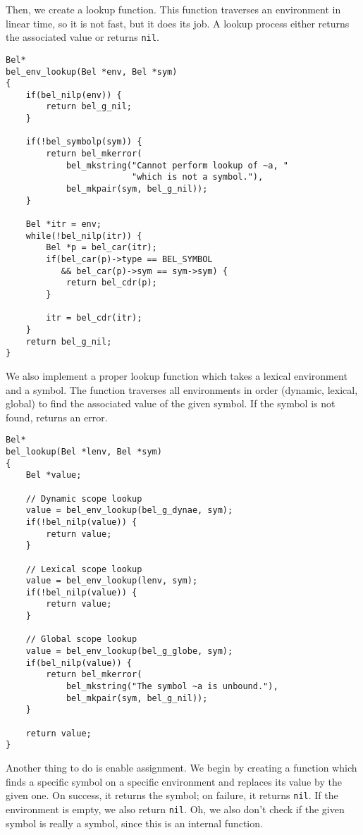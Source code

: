 \documentclass[openright,a4paper,twoside,12pt]{memoir}
\begin{document}
Then, we create a lookup function. This function traverses an
environment in linear time, so it is not fast, but it does its job. A
lookup process either returns the associated value or returns \texttt{nil}.

\begin{verbatim}
Bel*
bel_env_lookup(Bel *env, Bel *sym)
{
    if(bel_nilp(env)) {
        return bel_g_nil;
    }
    
    if(!bel_symbolp(sym)) {
        return bel_mkerror(
            bel_mkstring("Cannot perform lookup of ~a, "
                         "which is not a symbol."),
            bel_mkpair(sym, bel_g_nil));
    }

    Bel *itr = env;
    while(!bel_nilp(itr)) {
        Bel *p = bel_car(itr);
        if(bel_car(p)->type == BEL_SYMBOL
           && bel_car(p)->sym == sym->sym) {
            return bel_cdr(p);
        }
        
        itr = bel_cdr(itr);
    }
    return bel_g_nil;
}
\end{verbatim}

We also implement a proper lookup function which takes a lexical
environment and a symbol. The function traverses all environments in
order (dynamic, lexical, global) to find the associated value of the
given symbol. If the symbol is not found, returns an error.

\begin{verbatim}
Bel*
bel_lookup(Bel *lenv, Bel *sym)
{
    Bel *value;

    // Dynamic scope lookup
    value = bel_env_lookup(bel_g_dynae, sym);
    if(!bel_nilp(value)) {
        return value;
    }
    
    // Lexical scope lookup
    value = bel_env_lookup(lenv, sym);
    if(!bel_nilp(value)) {
        return value;
    }

    // Global scope lookup
    value = bel_env_lookup(bel_g_globe, sym);
    if(bel_nilp(value)) {
        return bel_mkerror(
            bel_mkstring("The symbol ~a is unbound."),
            bel_mkpair(sym, bel_g_nil));
    }

    return value;
}
\end{verbatim}

Another thing to do is enable assignment. We begin by creating a
function which finds a specific symbol on a specific environment and
replaces its value by the given one. On success, it returns the
symbol; on failure, it returns \texttt{nil}. If the environment is empty, we
also return \texttt{nil}. Oh, we also don't check if the given symbol is really
a symbol, since this is an internal function.
\end{document}

